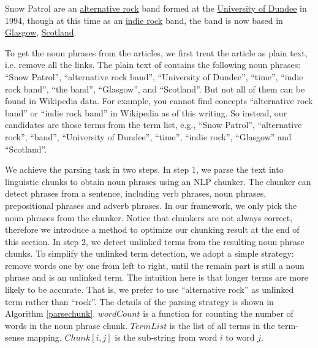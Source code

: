 \myskip
\begin{example}
\label{ex:snow}
Snow Patrol are an {\color{blue}\uline{alternative rock}} band
formed at the {\color{blue}\uline{University of Dundee}} in 1994,
though at this time as an {\color{blue}\uline{indie rock}} band,
the band is now based in {\color{blue}\uline{Glasgow}},
{\color{blue}\uline{Scotland}}.
\end{example}
\myskip

To get the noun phrases from the articles,
we first treat the article as plain text, i.e. remove all the links.
The plain text of  contains the following noun phrases:
``Snow Patrol'', ``alternative rock band'', ``University of Dundee'',
``time'', ``indie rock band'', ``the band'', ``Glasgow'', and ``Scotland''.
But not all of them can be found in Wikipedia data.
For example, you cannot find concepts ``alternative rock band'' or
``indie rock band'' in Wikipedia as of this writing.
So instead, our candidates are those terms from the term list, e.g.,
``Snow Patrol'', ``alternative rock'', ``band'', ``University of Dundee'',
``time'', ``indie rock'', ``Glasgow'' and ``Scotland''.

We achieve the parsing task in two steps.
In step 1, we parse the text into linguistic chunks to obtain noun phrases
using an NLP chunker. The chunker can detect phrases from
a sentence, including verb phrases, noun phrases, prepositional phrases and
adverb phrases. In our framework, we only pick the noun phrases from the chunker.
Notice that chunkers are not always correct, therefore we introduce
a method to optimize our chunking result at the end of this section.
In step 2, we detect unlinked terms from the resulting noun
phrase chunks. To simplify the unlinked term
detection, we adopt a simple strategy:
remove words one by one from left to right, until the remain part is
still a noun phrase and is an unlinked term.
The intuition here is that longer terms are more likely to
be accurate. That is, we prefer to use ``alternative rock'' as
unlinked term rather than ``rock''.
The details of the parsing strategy is shown in Algorithm \ref{parsechunk}.
$wordCount$ is a function for counting the number of words in the
noun phrase chunk. 
$TermList$ is the list of all terms in the term-sense mapping.
$Chunk[i,j]$ is the sub-string from word $i$ to word $j$.

